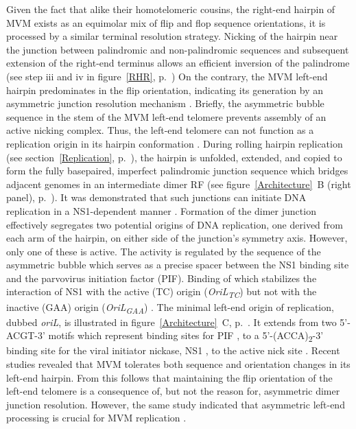 Given the fact that alike their homotelomeric cousins, the right-end hairpin of MVM exists as an equimolar mix of flip and flop sequence orientations, it is processed by a similar terminal resolution strategy. Nicking of the hairpin near the junction between palindromic and non-palindromic sequences and subsequent extension of the right-end terminus allows an efficient inversion of the palindrome (see step iii and iv in figure~\ref{RHR}, p.~\pageref{RHR}) On the contrary, the MVM left-end hairpin predominates in the flip orientation, indicating its generation by an asymmetric junction resolution mechanism \cite{pmid12743281}. Briefly, the asymmetric bubble sequence in the stem of the MVM left-end telomere prevents assembly of an active nicking complex. Thus, the left-end telomere can not function as a replication origin in its hairpin conformation \cite{pmid8995615}. During rolling hairpin replication (see section~\ref{Replication}, p.~\pageref{Replication}), the hairpin is unfolded, extended, and copied to form the fully basepaired, imperfect palindromic junction sequence which bridges adjacent genomes in an intermediate dimer RF (see figure~\ref{Architecture}~B (right panel), p.~\pageref{Architecture}). It was demonstrated that such junctions can initiate DNA replication in a NS1-dependent manner \cite{pmid8076610, pmid1530771}. Formation of the dimer junction effectively segregates two potential origins of DNA replication, one derived from each arm of the hairpin, on either side of the junction's symmetry axis. However, only one of these is active. The activity is regulated by the sequence of the asymmetric bubble which serves as a precise spacer between the NS1 binding site and the parvovirus initiation factor (PIF). Binding of which stabilizes the interaction of NS1 with the active (TC) origin (\textit{OriL\textsubscript{TC}}) but not with the inactive (GAA) origin (\textit{OriL\textsubscript{GAA}}) \cite{pmid11435581}. The minimal left-end origin of replication, dubbed \textit{oriL}, is illustrated in figure~\ref{Architecture}~C, p.~\pageref{Architecture}. It extends from two 5'-ACGT-3' motifs which represent binding sites for PIF \cite{pmid8995666, pmid9223459, pmid10523663}, to a 5'-(ACCA)\textsubscript{2}-3' binding site for the viral initiator nickase, NS1 \cite{pmid7853501}, to the active nick site \cite{pmid8076610}. Recent studies revealed that MVM tolerates both sequence and orientation changes in its left-end hairpin. From this follows that maintaining the flip orientation of the left-end telomere is a consequence of, but not the reason for, asymmetric dimer junction resolution. However, the same study indicated that asymmetric left-end processing is crucial for MVM replication \cite{pmid22933276}.  

